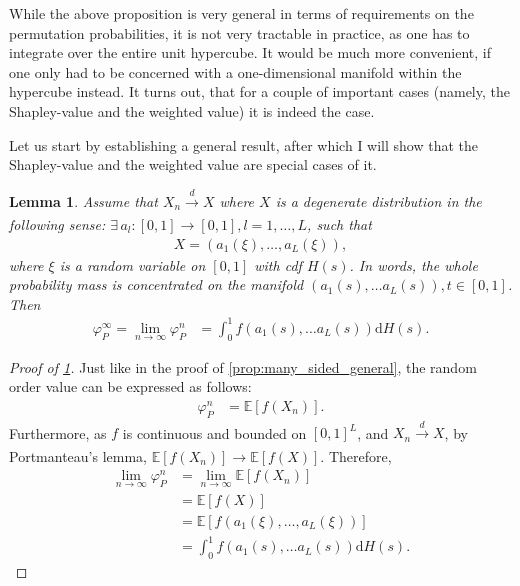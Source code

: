 \documentclass[a4paper]{article}
\newtheorem{lemma}{Lemma}
\newcommand{\E}{\mathbb{E}}
\begin{document}
While the above proposition is very general in terms of requirements on the permutation probabilities, it is not very tractable in practice, as one has to integrate over the entire unit hypercube.
It would be much more convenient, if one only had to be concerned with a one-dimensional manifold within the hypercube instead.
It turns out, that for a couple of important cases (namely, the Shapley-value and the weighted value) it is indeed the case.

Let us start by establishing a general result, after which I will show that the Shapley-value and the weighted value are special cases of it.

\begin{lemma}
    \label{lem:many_sided_manifold}
    Assume that $X_n \xrightarrow[]{d} X$ where $X$ is a degenerate distribution in the following sense: $\exists \, a_l: [0, 1] \to [0, 1], l = 1, \dots, L$, such that
    \begin{align*}
        X = (a_1(\xi), \dots, a_L(\xi)),
    \end{align*}
    where $\xi$ is a random variable on $[0, 1]$ with cdf $H(s)$.
    In words, the whole probability mass is concentrated on the manifold $(a_1(s), \dots a_L(s)), t \in [0, 1]$.
    Then
    \begin{align*}
        \varphi_P^\infty = \lim_{n \to \infty} \varphi_P^n &= \int_0^1 f(a_1(s), \dots a_L(s)) \mathrm{d}H(s).
    \end{align*}
\end{lemma}

\begin{proof}[Proof of \cref{lem:many_sided_manifold}]
    Just like in the proof of \cref{prop:many_sided_general}, the random order value can be expressed as follows:
    \begin{align*}
        \varphi_P^n &= \E[f(X_n)].
    \end{align*}
    Furthermore, as $f$ is continuous and bounded on $[0, 1]^L$, and $X_n \xrightarrow[]{d} X$, by Portmanteau's lemma, $\E[f(X_n)] \to \E[f(X)]$.
    Therefore,
    \begin{align*}
        \lim_{n \to \infty} \varphi_P^n &= \lim_{n \to \infty} \E[f(X_n)] \\
        &= \E[f(X)] \\
        &= \E[f(a_1(\xi), \dots, a_L(\xi))] \\
        &= \int_0^1 f(a_1(s), \dots a_L(s)) \mathrm{d}H(s).
    \end{align*}
\end{proof}
\end{document}
